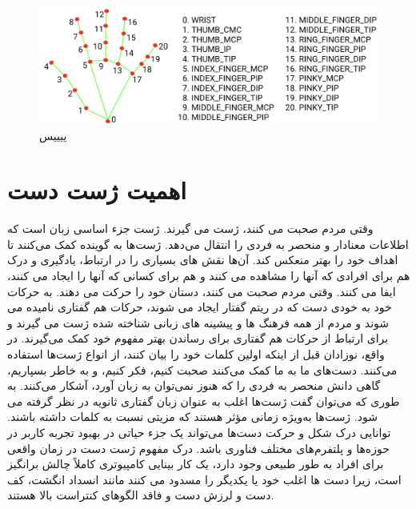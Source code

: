 \begin{figure}
    \centering
        \includegraphics[totalheight=5cm]{hand-landmarks.png}
    \caption{ییییس}
    \label{fig:verticalcell}
\end{figure}


\section{اهمیت ژست دست}
وقتی مردم صحبت می کنند، ژست می گیرند. ژست جزء اساسی زبان است که اطلاعات معنادار و منحصر به فردی را انتقال می‌دهد. ژست‌ها به گوینده کمک می‌کنند تا اهداف خود را بهتر منعکس کند. 
آن‌‌ها نقش های بسیاری را در ارتباط، یادگیری و درک هم برای افرادی که آنها را مشاهده می کنند و هم برای کسانی که آنها را ایجاد می کنند، ایفا می کنند.
وقتی مردم صحبت می کنند، دستان خود را حرکت می دهند. به حرکات خود به خودی دست که در ریتم گفتار ایجاد می شوند، حرکات هم گفتاری 
نامیده می شوند و مردم از همه فرهنگ ها و پیشینه های زبانی شناخته شده ژست می گیرند و برای ارتباط از حرکات هم گفتاری برای رساندن بهتر مفهوم خود کمک می‌گیرند.
در واقع، نوزادان قبل از اینکه اولین کلمات خود را بیان کنند، از انواع ژست‌ها استفاده می‌کنند. دست‌های ما به ما کمک می‌کنند صحبت کنیم، فکر کنیم، و به خاطر بسپاریم، گاهی دانش
منحصر به فردی را که هنوز نمی‌توان به زبان آورد، آشکار می‌کنند. به طوری که می‌توان گفت ژست‌ها اغلب به عنوان زبان گفتاری ثانویه در نظر گرفته می شود.\cite{clough2020role}
ژست‌ها به‌ویژه زمانی مؤثر هستند که مزیتی نسبت به کلمات داشته باشند. \cite{kang2016hands}
توانایی درک شکل و حرکت دست‌ها می‌تواند یک جزء حیاتی در بهبود تجربه کاربر  
در حوزه‌ها و پلتفرم‌های مختلف فناوری باشد. درک مفهوم ژست دست در زمان واقعی برای افراد به طور طبیعی وجود دارد، یک کار بینایی 
کامپیوتری کاملاً چالش برانگیز است، زیرا دست ها اغلب خود یا یکدیگر را مسدود می کنند مانند انسداد انگشت، کف دست و لرزش دست و فاقد الگوهای کنتراست بالا هستند.\cite{zhang2020mediapipe}

